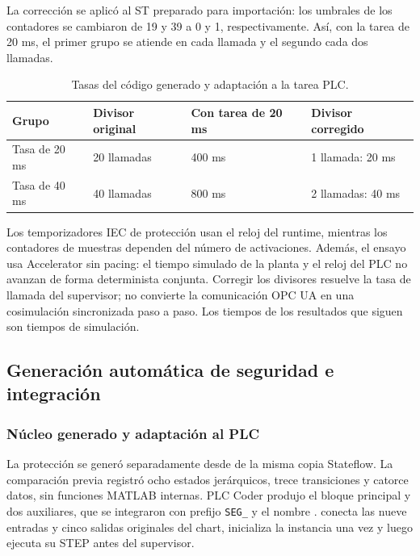 \documentclass[a4paper,10pt,onecolumn,journal]{ieeeconf}
\numberwithin{equation}{section}
\begin{document}
La corrección se aplicó al ST preparado para importación: los umbrales de los contadores se cambiaron de 19 y 39 a 0 y 1, respectivamente. Así, con la tarea de 20 ms, el primer grupo se atiende en cada llamada y el segundo cada dos llamadas.

\begin{table}[!htb]
\centering\small
\caption{Tasas del código generado y adaptación a la tarea PLC.}\label{tab:tasas_plc_coder}
\begin{tabular}{L{4.3cm} C{3.1cm} C{3.1cm} C{3.1cm}}
\toprule
Grupo & Divisor original & Con tarea de 20 ms & Divisor corregido\\
\midrule
Tasa de 20 ms & 20 llamadas & 400 ms & 1 llamada: 20 ms\\
Tasa de 40 ms & 40 llamadas & 800 ms & 2 llamadas: 40 ms\\
\bottomrule
\end{tabular}
\end{table}

Los temporizadores IEC de protección usan el reloj del runtime, mientras los contadores de muestras dependen del número de activaciones. Además, el ensayo usa Accelerator sin pacing: el tiempo simulado de la planta y el reloj del PLC no avanzan de forma determinista conjunta. Corregir los divisores resuelve la tasa de llamada del supervisor; no convierte la comunicación OPC UA en una cosimulación sincronizada paso a paso. Los tiempos de los resultados que siguen son tiempos de simulación.


\subsection{Generación automática de seguridad e integración}
\label{subsec:seg_generada_codesys}
\subsubsection{Núcleo generado y adaptación al PLC}
La protección se generó separadamente desde  de la misma copia Stateflow. La comparación previa registró ocho estados jerárquicos, trece transiciones y catorce datos, sin funciones MATLAB internas. PLC Coder produjo el bloque principal y dos auxiliares, que se integraron con prefijo \texttt{SEG\_} y el nombre .  conecta las nueve entradas y cinco salidas originales del chart, inicializa la instancia una vez y luego ejecuta su STEP antes del supervisor.
\end{document}
